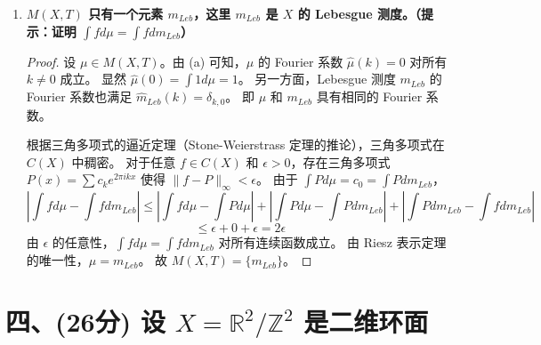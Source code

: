 \documentclass[a4paper,12pt]{article}
\begin{document}
\begin{enumerate}
\begin{enumerate}
        \item \textbf{$M(X, T)$ 只有一个元素 $m_{Leb}$，这里 $m_{Leb}$ 是 $X$ 的 Lebesgue 测度。（提示：证明 $\int f d\mu = \int f dm_{Leb}$）}
        
        \begin{proof}
            设 $\mu \in M(X, T)$。由 (a) 可知，$\mu$ 的 Fourier 系数 $\hat{\mu}(k) = 0$ 对所有 $k \neq 0$ 成立。
            显然 $\hat{\mu}(0) = \int 1 d\mu = 1$。
            另一方面，Lebesgue 测度 $m_{Leb}$ 的 Fourier 系数也满足 $\hat{m}_{Leb}(k) = \delta_{k, 0}$。
            即 $\mu$ 和 $m_{Leb}$ 具有相同的 Fourier 系数。
            
            根据三角多项式的逼近定理（Stone-Weierstrass 定理的推论），三角多项式在 $C(X)$ 中稠密。
            对于任意 $f \in C(X)$ 和 $\epsilon > 0$，存在三角多项式 $P(x) = \sum c_k e^{2\pi i k x}$ 使得 $\|f - P\|_\infty < \epsilon$。
            由于 $\int P d\mu = c_0 = \int P dm_{Leb}$，
            $$ \left| \int f d\mu - \int f dm_{Leb} \right| \le \left| \int f d\mu - \int P d\mu \right| + \left| \int P d\mu - \int P dm_{Leb} \right| + \left| \int P dm_{Leb} - \int f dm_{Leb} \right| $$
            $$ \le \epsilon + 0 + \epsilon = 2\epsilon $$
            由 $\epsilon$ 的任意性，$\int f d\mu = \int f dm_{Leb}$ 对所有连续函数成立。
            由 Riesz 表示定理的唯一性，$\mu = m_{Leb}$。
            故 $M(X, T) = \{m_{Leb}\}$。
        \end{proof}
    \end{enumerate}
\end{enumerate}

\section*{四、(26分) 设 $X = \mathbb{R}^2/\mathbb{Z}^2$ 是二维环面}
\end{document}
